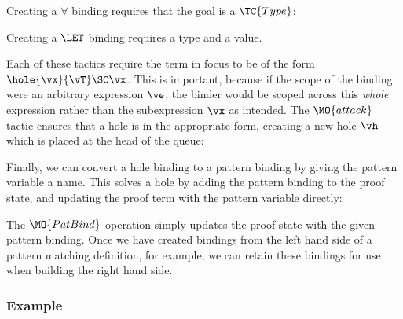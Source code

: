 \noindent
Creating a $\forall$ binding requires that the goal is a $\TC{Type}$:


\noindent
Creating a $\LET$ binding requires a type and a value.


Each of these tactics require the term in focus to be of the form $\hole{\vx}{\vT}\SC\vx$.
This is important, because if the scope of the binding were an arbitrary expression $\ve$,
the binder would be scoped across this \emph{whole} expression rather than the subexpression
$\vx$ as intended.
The $\MO{attack}$ tactic ensures that a hole
is in the appropriate form, creating a new hole $\vh$ which is placed at the head
of the queue:


Finally, we can convert a hole binding to a pattern binding by giving the 
pattern variable a name. This solves a hole
by adding the pattern binding to the proof state, and updating the proof term
with the pattern variable directly:


The $\MO{PatBind}$ operation simply updates the proof state with the given pattern
binding. Once we have created bindings from the left hand side of a pattern
matching definition, for example, we can retain these bindings for use when
building the right hand side.

\subsubsection{Example}

